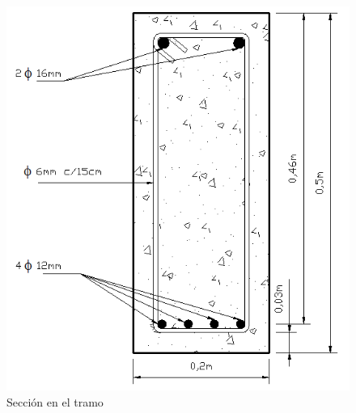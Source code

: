 \begin{enumerate}
\begin{itemize}
\begin{figure}[H]
\begin{center}
     \includegraphics[scale = 0.5]{chapters/chapter_1/images/figura3.png}
     \caption{Sección en el tramo}
\end{center}
\end{figure}


\end{itemize}
\end{enumerate}
